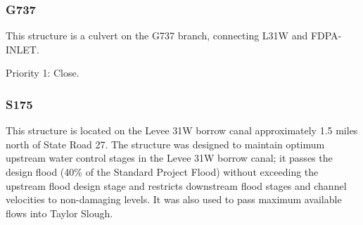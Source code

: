 \clearpage

\subsubsection{G737}
This structure is a culvert on the G737 branch, connecting L31W and FDPA-INLET.


\begin{packed_items}
\item Priority 1: Close.
\end{packed_items}

\clearpage




\subsubsection{S175}

This structure is located on the Levee 31W borrow canal approximately 1.5 miles north of State Road 27. The structure was designed to maintain optimum upstream water control stages in the Levee 31W borrow canal; it passes the design flood (40\% of the Standard Project Flood) without exceeding the upstream flood design stage and restricts downstream flood stages and channel velocities to non-damaging levels. It was also used to pass maximum available flows into Taylor Slough.



